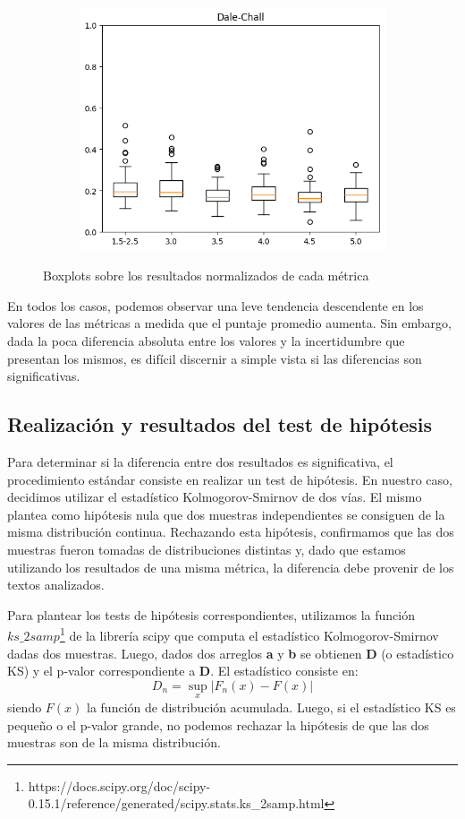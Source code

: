 \documentclass[12pt,journal,compsoc]{IEEEtran}
\begin{document}
\begin{figure}[H]
\begin{subfigure}{0.27\textwidth}
\includegraphics[scale=0.41]{../unigrams/scripts/boxplots/Dale-Chall.png}
\end{subfigure}
\caption{\small Boxplots sobre los resultados normalizados de cada métrica}
\label{fig:boxplots}
\end{figure}

En todos los casos, podemos observar una leve tendencia descendente en los valores de las métricas a medida que el puntaje promedio aumenta. Sin embargo, dada la poca diferencia absoluta entre los valores y la incertidumbre que presentan los mismos, es difícil discernir a simple vista si las diferencias son significativas.

\subsection{Realización y resultados del test de hipótesis}

Para determinar si la diferencia entre dos resultados es significativa, el procedimiento estándar consiste en realizar un test de hipótesis. En nuestro caso, decidimos utilizar el estadístico Kolmogorov-Smirnov de dos vías. El mismo plantea como hipótesis nula que dos muestras independientes se consiguen de la misma distribución continua. Rechazando esta hipótesis, confirmamos que las dos muestras fueron tomadas de distribuciones distintas y, dado que estamos utilizando los resultados de una misma métrica, la diferencia debe provenir de los textos analizados.

Para plantear los tests de hipótesis correspondientes, utilizamos la función $ks\_2samp$\footnote{https://docs.scipy.org/doc/scipy-0.15.1/reference/generated/scipy.stats.ks\_2samp.html} de la librería scipy que computa el estadístico Kolmogorov-Smirnov dadas dos muestras. Luego, dados dos arreglos \textbf{a} y \textbf{b} se obtienen \textbf{D} (o estadístico KS) y el p-valor correspondiente a \textbf{D}. El estadístico consiste en:
$$D_{n}=\sup_{x}|F_{n}(x)-F(x)|$$
siendo $F(x)$ la función de distribución acumulada. Luego, si el estadístico KS es pequeño o el p-valor grande, no podemos rechazar la hipótesis de que las dos muestras son de la misma distribución\cite{degroot}.\\
\end{document}
